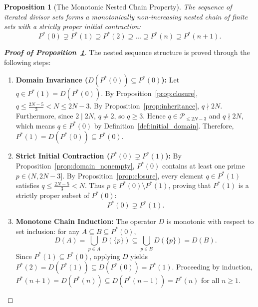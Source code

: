 \documentclass[11pt,a4paper]{article}
\newtheorem{proposition}[theorem]{Proposition}
\theoremstyle{definition}
\begin{document}
\begin{proposition}[The Monotonic Nested Chain Property]
\label{prop:nested}
The sequence of iterated divisor sets forms a monotonically non-increasing nested chain of finite sets with a strictly proper initial contraction:
\[
P^*(0) \supsetneq P^*(1) \supseteq P^*(2) \supseteq \dots \supseteq P^*(n) \supseteq P^*(n+1).
\]
\end{proposition}
\begin{proof}[\textbf{Proof of Proposition~\ref{prop:nested}}]
The nested sequence structure is proved through the following steps:
\begin{enumerate}
    \item \textbf{Domain Invariance ($D(P^*(0)) \subseteq P^*(0)$):} Let $q \in P^*(1) = D(P^*(0))$. By Proposition~\ref{prop:closure}, $q \le \frac{2N-5}{3} < N \le 2N - 3$. By Proposition~\ref{prop:inheritance}, $q \nmid 2N$. Furthermore, since $2 \mid 2N$, $q \neq 2$, so $q \ge 3$. Hence $q \in \mathcal{P}_{\le 2N-3}$ and $q \nmid 2N$, which means $q \in P^*(0)$ by Definition~\ref{def:initial_domain}. Therefore, $P^*(1) = D(P^*(0)) \subseteq P^*(0)$.
    \item \textbf{Strict Initial Contraction ($P^*(0) \supsetneq P^*(1)$):} By Proposition~\ref{prop:domain_nonempty}, $P^*(0)$ contains at least one prime $p \in (N, 2N-3]$. By Proposition~\ref{prop:closure}, every element $q \in P^*(1)$ satisfies $q \le \frac{2N-5}{3} < N$. Thus $p \in P^*(0) \setminus P^*(1)$, proving that $P^*(1)$ is a strictly proper subset of $P^*(0)$:
    \[
    P^*(0) \supsetneq P^*(1).
    \]
    \item \textbf{Monotone Chain Induction:} The operator $D$ is monotonic with respect to set inclusion: for any $A \subseteq B \subseteq P^*(0)$,
    \[
    D(A) = \bigcup_{p \in A} D(\{p\}) \subseteq \bigcup_{p \in B} D(\{p\}) = D(B).
    \]
    Since $P^*(1) \subseteq P^*(0)$, applying $D$ yields $P^*(2) = D(P^*(1)) \subseteq D(P^*(0)) = P^*(1)$. Proceeding by induction, $P^*(n+1) = D(P^*(n)) \subseteq D(P^*(n-1)) = P^*(n)$ for all $n \ge 1$.
\end{enumerate}
\end{proof}
\end{document}
